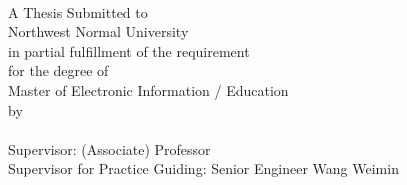 {\begin{titlepage}
		\begin{center}
			\qquad\\
			\vspace*{2.1cm}
			\begin{spacing}{1.5}
				\er\@etitle

			\end{spacing}

			\begin{spacing}{2.0}
				\vspace*{1.85\baselineskip}
				\sihao
				A Thesis Submitted to\\
				Northwest Normal University\\
				in partial fulfillment of the requirement\\
				for the degree of\\
				Master of Electronic Information / Education\\
				by\\
				\@ename \\
				Supervisor: (Associate) Professor \@esupervisor\\
				Supervisor for Practice Guiding: Senior Engineer Wang Weimin

				\vspace*{3\baselineskip}
				\sanhao\@edate


			\end{spacing}
		\end{center}


	\end{titlepage}

	\clearpage
	\thispagestyle{empty}
	\begin{center}\hei\xiaoer{\@gongjuren}\end{center}\par
	\vspace{2.8\baselineskip}

	\begin{center}\hei\xiaoer{\@authorizationtitle}\end{center}\par
	\vspace{1.8\baselineskip}

	{
		\linespread{2.0}
		\song\sihao{\@authorizationcontent}\par

}}
